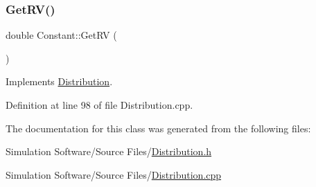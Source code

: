 \subsubsection{\texorpdfstring{Get\+R\+V()}{GetRV()}}
{\footnotesize\ttfamily double Constant\+::\+Get\+RV (\begin{DoxyParamCaption}{ }\end{DoxyParamCaption})\hspace{0.3cm}{\ttfamily [virtual]}}



Implements \hyperlink{class_distribution_a63b433850d7b47d84eb69448f7916719}{Distribution}.



Definition at line 98 of file Distribution.\+cpp.



The documentation for this class was generated from the following files\+:\begin{DoxyCompactItemize}
\item 
Simulation Software/\+Source Files/\hyperlink{_distribution_8h}{Distribution.\+h}\item 
Simulation Software/\+Source Files/\hyperlink{_distribution_8cpp}{Distribution.\+cpp}\end{DoxyCompactItemize}
